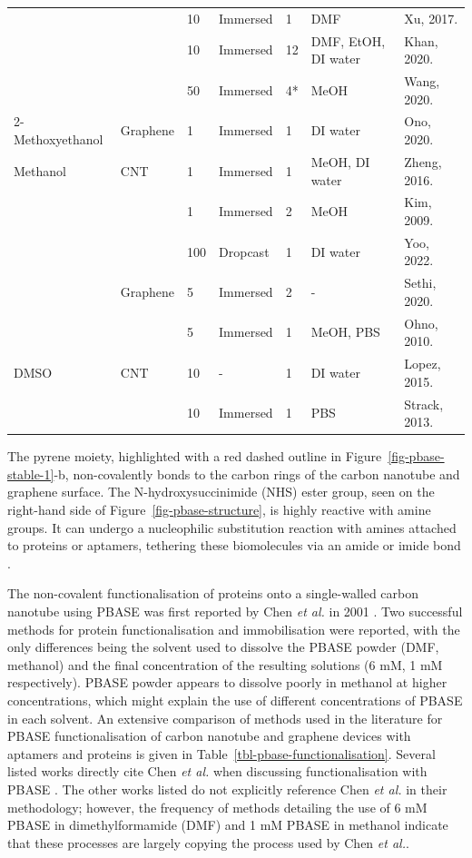 \documentclass[
  a4paper,
]{scrbook}
\begin{document}
\begin{longtable}[]{@{}lllllll@{}}
& & 10 & Immersed & 1 & DMF & Xu, 2017. \cite{Xu2017} \\
& & 10 & Immersed & 12 & DMF, EtOH, DI water & Khan, 2020.
\cite{Khan2020} \\
& & 50 & Immersed & 4* & MeOH & Wang, 2020. \cite{Wang2020} \\
2-Methoxyethanol & Graphene & 1 & Immersed & 1 & DI water & Ono, 2020.
\cite{Ono2020} \\
Methanol & CNT & 1 & Immersed & 1 & MeOH, DI water & Zheng, 2016.
\cite{Zheng2016} \\
& & 1 & Immersed & 2 & MeOH & Kim, 2009. \cite{Kim2009} \\
& & 100 & Dropcast & 1 & DI water & Yoo, 2022. \cite{Yoo2022} \\
& Graphene & 5 & Immersed & 2 & - & Sethi, 2020. \cite{Sethi2020} \\
& & 5 & Immersed & 1 & MeOH, PBS & Ohno, 2010. \cite{Ohno2010} \\
DMSO & CNT & 10 & - & 1 & DI water & Lopez, 2015. \cite{Lopez2015} \\
& & 10 & Immersed & 1 & PBS & Strack, 2013. \cite{Strack2013} \\
\end{longtable}

\newpage
{}

The pyrene moiety, highlighted with a red dashed outline in
Figure~\ref{fig-pbase-stable-1}-b, non-covalently bonds to the carbon
rings of the carbon nanotube and graphene surface. The
N-hydroxysuccinimide (NHS) ester group, seen on the right-hand side of
Figure~\ref{fig-pbase-structure}, is highly reactive with amine groups.
It can undergo a nucleophilic substitution reaction with amines attached
to proteins or aptamers, tethering these biomolecules via an amide or
imide bond
\autocite{Chen2001,Hermanson2013-16,Hermanson2013-3,Mishyn2022}.

The non-covalent functionalisation of proteins onto a single-walled
carbon nanotube using PBASE was first reported by Chen \emph{et al.} in
2001 \autocite{Chen2001}. Two successful methods for protein
functionalisation and immobilisation were reported, with the only
differences being the solvent used to dissolve the PBASE powder (DMF,
methanol) and the final concentration of the resulting solutions (6 mM,
1 mM respectively). PBASE powder appears to dissolve poorly in methanol
at higher concentrations, which might explain the use of different
concentrations of PBASE in each solvent. An extensive comparison of
methods used in the literature for PBASE functionalisation of carbon
nanotube and graphene devices with aptamers and proteins is given in
Table~\ref{tbl-pbase-functionalisation}. Several listed works directly
cite Chen \emph{et al.} when discussing functionalisation with PBASE
\autocite{Besteman2003,Cella2010,Campos2019,Zheng2016,Ohno2010}. The
other works listed do not explicitly reference Chen \emph{et al.} in
their methodology; however, the frequency of methods detailing the use
of 6 mM PBASE in dimethylformamide (DMF) and 1 mM PBASE in methanol
indicate that these processes are largely copying the process used by
Chen \emph{et al.}.
\end{document}
